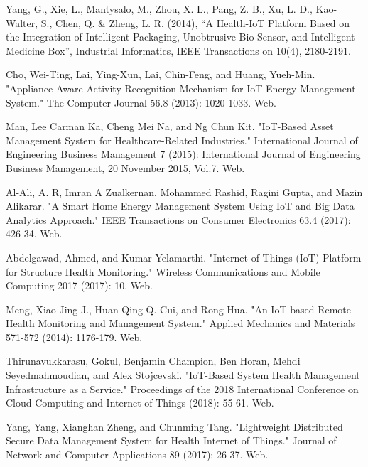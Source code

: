 \documentclass[conference]{IEEEtran}
\begin{document}
\begin{thebibliography}{00}
Yang, G., Xie, L., Mantysalo, M., Zhou, X. L., Pang, Z. B., Xu, L. D., Kao-Walter, S., Chen, Q. \& Zheng, L. R. (2014), “A Health-IoT Platform Based on the Integration of Intelligent Packaging, Unobtrusive Bio-Sensor, and Intelligent Medicine Box”, Industrial Informatics, IEEE Transactions on 10(4), 2180-2191.

Cho, Wei-Ting, Lai, Ying-Xun, Lai, Chin-Feng, and Huang, Yueh-Min. "Appliance-Aware Activity Recognition Mechanism for IoT Energy Management System." The Computer Journal 56.8 (2013): 1020-1033. Web.

Man, Lee Carman Ka, Cheng Mei Na, and Ng Chun Kit. "IoT-Based Asset Management System for Healthcare-Related Industries." International Journal of Engineering Business Management 7 (2015): International Journal of Engineering Business Management, 20 November 2015, Vol.7. Web.

Al-Ali, A. R, Imran A Zualkernan, Mohammed Rashid, Ragini Gupta, and Mazin Alikarar. "A Smart Home Energy Management System Using IoT and Big Data Analytics Approach." IEEE Transactions on Consumer Electronics 63.4 (2017): 426-34. Web.




 Abdelgawad, Ahmed, and Kumar Yelamarthi. "Internet of Things (IoT) Platform for Structure Health Monitoring." Wireless Communications and Mobile Computing 2017 (2017): 10. Web.

 Meng, Xiao Jing J., Huan Qing Q. Cui, and Rong Hua. "An IoT-based Remote Health Monitoring and Management System." Applied Mechanics and Materials 571-572 (2014): 1176-179. Web.

 Thirunavukkarasu, Gokul, Benjamin Champion, Ben Horan, Mehdi Seyedmahmoudian, and Alex Stojcevski. "IoT-Based System Health Management Infrastructure as a Service." Proceedings of the 2018 International Conference on Cloud Computing and Internet of Things (2018): 55-61. Web.

 Yang, Yang, Xianghan Zheng, and Chunming Tang. "Lightweight Distributed Secure Data Management System for Health Internet of Things." Journal of Network and Computer Applications 89 (2017): 26-37. Web.


\end{thebibliography}
\end{document}
